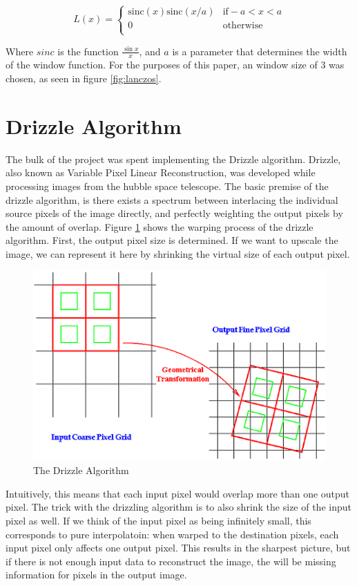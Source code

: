 \documentclass[conference]{IEEEtran}
\newcommand{\centerimage}[3]{
\begin{figure}[!h]  
\centering
#1
\caption{#2}
\label{#3}
\end{figure}}
\begin{document}
\begin{equation}
  L(x) = \begin{cases}
    \mathrm{sinc}(x) \mathrm{sinc}(x/a) & \mathrm{if} -a < x < a\\
    0 & \mathrm{otherwise}\\
    \end{cases}
\end{equation}

Where $sinc$ is the function $\frac{\sin x}{x}$, and $a$ is a
parameter that determines the width of the window function. For the
purposes of this paper, an window size of 3 was chosen, as seen in
figure \ref{fig:lanczos}. 

\section{Drizzle Algorithm}

The bulk of the project was spent implementing the Drizzle
algorithm. Drizzle, also known as Variable Pixel Linear
Reconstruction, was developed while processing images from the hubble
space telescope. The basic premise of the drizzle algorithm, is there
exists a spectrum between interlacing the individual source pixels of
the image directly, and perfectly weighting the output pixels by the
amount of overlap. Figure \ref{fig:drizzle} shows the warping process
of the drizzle algorithm. First, the output pixel size is
determined. If we want to upscale the image, we can represent it here
by shrinking the virtual size of each output pixel.

\centerimage{\includegraphics[width=0.9\columnwidth]{img/drizzle3.png}}{The
  Drizzle Algorithm}{fig:drizzle}

Intuitively, this means that each input pixel would overlap more than
one output pixel. The trick with the drizzling algorithm is to also
shrink the size of the input pixel as well. If we think of the input
pixel as being infinitely small, this corresponds to pure
interpolatoin: when warped to the destination pixels, each input pixel
only affects one output pixel. This results in the sharpest picture,
but if there is not enough input data to reconstruct the image, the
will be missing information for pixels in the output image.
\end{document}
